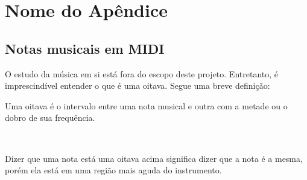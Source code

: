 


\chapter{Nome do Apêndice}

    \section{Notas musicais em MIDI}
    
        O estudo da música em si está fora do escopo deste projeto. Entretanto, é imprescindível entender o que é uma oitava. Segue uma breve definição: \epigraph{Uma oitava é o intervalo entre uma nota musical e outra com a metade ou o dobro de sua frequência.}{~\cite{WikipediaOitava}}
        
        Dizer que uma nota está uma oitava acima significa dizer que a nota é a mesma, porém ela está em uma região mais aguda do instrumento.
    
        
